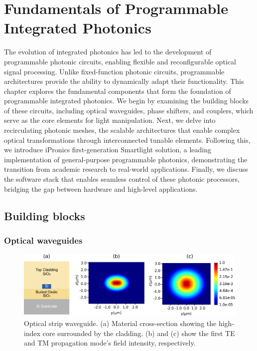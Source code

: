 
\chapter{Fundamentals of Programmable Integrated Photonics} \label{chap:fundamentals}

The evolution of integrated photonics has led to the development of programmable photonic circuits, enabling flexible and reconfigurable optical signal processing.
Unlike fixed-function photonic circuits, programmable architectures provide the ability to dynamically adapt their functionality.
This chapter explores the fundamental components that form the foundation of programmable integrated photonics.
We begin by examining the building blocks of these circuits, including optical waveguides, phase shifters, and couplers, which serve as the core elements for light manipulation.
Next, we delve into recirculating photonic meshes, the scalable architectures that enable complex optical transformations through interconnected tunable elements.
Following this, we introduce iPronics first-generation Smartlight solution, a leading implementation of general-purpose programmable photonics, demonstrating the transition from academic research to real-world applications.
Finally, we discuss the software stack that enables seamless control of these photonic processors, bridging the gap between hardware and high-level applications.

\section{Building blocks} \label{sec:building_blocks} %
\subsection{Optical waveguides} \label{sub:optical_wg} %

\begin{figure}[h]
	\begin{center}
		\includegraphics{figures/ch2-wg.pdf}
	\end{center}
	\caption{Optical strip waveguide. (a) Material cross-section showing the high-index  core surrounded by the  cladding. (b) and (c) show the first TE and TM propagation mode's field
		intensity, respectively.}\label{fig:ch2-wg}
\end{figure}

